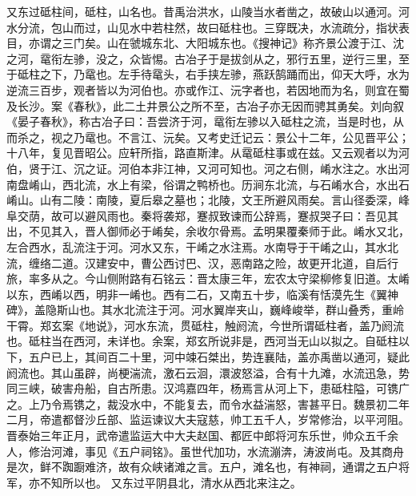 \documentclass[12pt,UTF8]{ctexbook}
\begin{document}
又东过砥柱间，砥柱，山名也。昔禹治洪水，山陵当水者凿之，故破山以通河。河水分流，包山而过，山见水中若柱然，故曰砥柱也。三穿既决，水流疏分，指状表目，亦谓之三门矣。山在虢城东北、大阳城东也。《搜神记》称齐景公渡于江、沈之河，鼋衔左骖，没之，众皆惕。古冶子于是拔剑从之，邪行五里，逆行三里，至于砥柱之下，乃鼋也。左手待鼋头，右手挟左骖，燕跃鹄踊而出，仰天大呼，水为逆流三百步，观者皆以为河伯也。亦或作江、沅字者也，若因地而为名，则宜在蜀及长沙。案《春秋》，此二土井景公之所不至，古冶子亦无因而骋其勇矣。刘向叙《晏子春秋》，称古冶子曰：吾尝济于河，鼋衔左骖以入砥柱之流，当是时也，从而杀之，视之乃鼋也。不言江、沅矣。又考史迁记云：景公十二年，公见晋平公；十八年，复见晋昭公。应轩所指，路直斯津。从鼋砥柱事或在兹。又云观者以为河伯，贤于江、沉之证。河伯本非江神，又河可知也。河之右侧，崤水注之。水出河南盘崤山，西北流，水上有梁，俗谓之鸭桥也。历涧东北流，与石崤水合，水出石崤山。山有二陵：南陵，夏后皋之墓也；北陵，文王所避风雨矣。言山径委深，峰阜交荫，故可以避风雨也。秦将袭郑，蹇叔致谏而公辞焉，蹇叔哭子曰：吾见其出，不见其入，晋人御师必于崤矣，余收尔骨焉。孟明果覆秦师于此。崤水又北，左合西水，乱流注于河。河水又东，干崤之水注焉。水南导于干崤之山，其水北流，缠络二道。汉建安中，曹公西讨巴、汉，恶南路之险，故更开北道，自后行旅，率多从之。今山侧附路有石铭云：晋太康三年，宏农太守梁柳修复旧道。太崤以东，西崤以西，明非一崤也。西有二石，又南五十步，临溪有恬漠先生《翼神碑》，盖隐斯山也。其水北流注于河。河水翼岸夹山，巍峰峻举，群山叠秀，重岭干霄。郑玄案《地说》，河水东流，贯砥柱，触阏流，今世所谓砥柱者，盖乃阏流也。砥柱当在西河，未详也。余案，郑玄所说非是，西河当无山以拟之。自砥柱以下，五户已上，其间百二十里，河中竦石桀出，势连襄陆，盖亦禹凿以通河，疑此阏流也。其山虽辟，尚梗湍流，激石云洄，澴波怒溢，合有十九滩，水流迅急，势同三峡，破害舟船，自古所患。汉鸿嘉四年，杨焉言从河上下，患砥柱隘，可镌广之。上乃令焉镌之，裁没水中，不能复去，而令水益湍怒，害甚平日。魏景初二年二月，帝遣都督沙丘部、监运谏议大夫寇慈，帅工五千人，岁常修治，以平河阻。晋泰始三年正月，武帝遣监运大中大夫赵国、都匠中郎将河东乐世，帅众五千余人，修治河滩，事见《五户祠铭》。虽世代加功，水流漰渀，涛波尚屯。及其商舟是次，鲜不踟蹰难济，故有众峡诸滩之言。五户，滩名也，有神祠，通谓之五户将军，亦不知所以也。
又东过平阴县北，清水从西北来注之。
\end{document}

